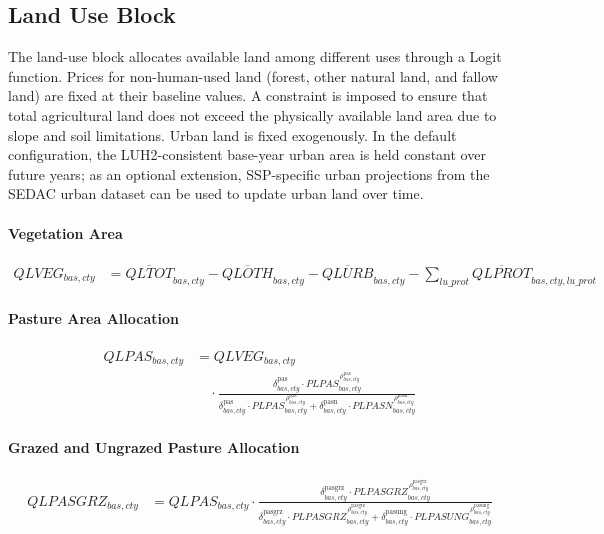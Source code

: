 \subsection{Land Use Block}

The land-use block allocates available land among different uses through a Logit function.  
Prices for non-human-used land (forest, other natural land, and fallow land) are fixed at their baseline values.  
A constraint is imposed to ensure that total agricultural land does not exceed the physically available land area due to slope and soil limitations.  
Urban land is fixed exogenously. In the default configuration, the LUH2-consistent base-year urban area is held constant over future years; as an optional extension, SSP-specific urban projections from the SEDAC urban dataset can be used to update urban land over time.

\paragraph{Vegetation Area}
\begin{align}
  QLVEG_{bas,cty}
  &= 
     \overline{QLTOT}_{bas,cty}
     - \overline{QLOTH}_{bas,cty}
     - \overline{QLURB}_{bas,cty}
     - \sum_{lu\_prot}\overline{QLPROT}_{bas,cty,lu\_prot}
  \tag{QLVEGEQ}\label{eq:QLVEGEQ}
\end{align}

\paragraph{Pasture Area Allocation}
\begin{align}
  QLPAS_{bas,cty}
  &=
    QLVEG_{bas,cty}
    \nonumber\\[-0.3em]
  &\quad\cdot
    \frac{
      \delta^{\text{pas}}_{bas,cty}
      \cdot
      PLPAS_{bas,cty}^{\,\rho^{\text{pas}}_{bas,cty}}
    }{
      \delta^{\text{pas}}_{bas,cty}
      \cdot
      PLPAS_{bas,cty}^{\,\rho^{\text{pas}}_{bas,cty}}
      +
      \delta^{\text{pasn}}_{bas,cty}
      \cdot
      PLPASN_{bas,cty}^{\,\rho^{\text{pasn}}_{bas,cty}}
    }
  \tag{QLPASEQ}\label{eq:QLPASEQ}
\end{align}

\paragraph{Grazed and Ungrazed Pasture Allocation}
\begin{align}
  QLPASGRZ_{bas,cty}
  &=
    QLPAS_{bas,cty}
    \cdot
    \frac{
      \delta^{\text{pasgrz}}_{bas,cty}
      \cdot
      PLPASGRZ_{bas,cty}^{\,\rho^{\text{pasgrz}}_{bas,cty}}
    }{
      \delta^{\text{pasgrz}}_{bas,cty}
      \cdot
      PLPASGRZ_{bas,cty}^{\,\rho^{\text{pasgrz}}_{bas,cty}}
      +
      \delta^{\text{pasung}}_{bas,cty}
      \cdot
      PLPASUNG_{bas,cty}^{\,\rho^{\text{pasung}}_{bas,cty}}
    }
  \tag{QLPASGRZEQ}\label{eq:QLPASGRZEQ}
\end{align}

